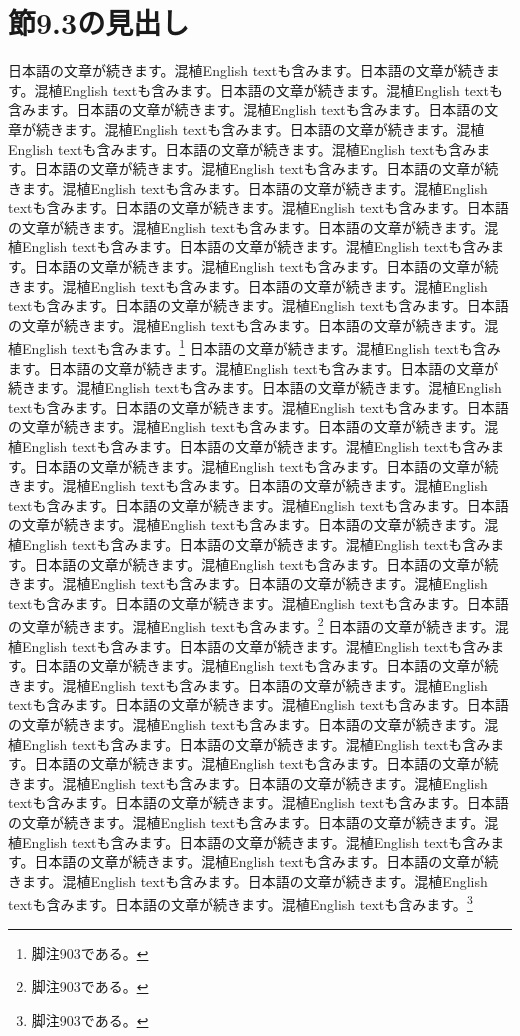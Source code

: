 \documentclass[pdflatex,book]{jlreq}
\begin{document}
\section{節9.3の見出し}
日本語の文章が続きます。混植English textも含みます。日本語の文章が続きます。混植English textも含みます。日本語の文章が続きます。混植English textも含みます。日本語の文章が続きます。混植English textも含みます。日本語の文章が続きます。混植English textも含みます。日本語の文章が続きます。混植English textも含みます。日本語の文章が続きます。混植English textも含みます。日本語の文章が続きます。混植English textも含みます。日本語の文章が続きます。混植English textも含みます。日本語の文章が続きます。混植English textも含みます。日本語の文章が続きます。混植English textも含みます。日本語の文章が続きます。混植English textも含みます。日本語の文章が続きます。混植English textも含みます。日本語の文章が続きます。混植English textも含みます。日本語の文章が続きます。混植English textも含みます。日本語の文章が続きます。混植English textも含みます。日本語の文章が続きます。混植English textも含みます。日本語の文章が続きます。混植English textも含みます。日本語の文章が続きます。混植English textも含みます。日本語の文章が続きます。混植English textも含みます。\footnote{脚注903である。}
日本語の文章が続きます。混植English textも含みます。日本語の文章が続きます。混植English textも含みます。日本語の文章が続きます。混植English textも含みます。日本語の文章が続きます。混植English textも含みます。日本語の文章が続きます。混植English textも含みます。日本語の文章が続きます。混植English textも含みます。日本語の文章が続きます。混植English textも含みます。日本語の文章が続きます。混植English textも含みます。日本語の文章が続きます。混植English textも含みます。日本語の文章が続きます。混植English textも含みます。日本語の文章が続きます。混植English textも含みます。日本語の文章が続きます。混植English textも含みます。日本語の文章が続きます。混植English textも含みます。日本語の文章が続きます。混植English textも含みます。日本語の文章が続きます。混植English textも含みます。日本語の文章が続きます。混植English textも含みます。日本語の文章が続きます。混植English textも含みます。日本語の文章が続きます。混植English textも含みます。日本語の文章が続きます。混植English textも含みます。日本語の文章が続きます。混植English textも含みます。\footnote{脚注903である。}
日本語の文章が続きます。混植English textも含みます。日本語の文章が続きます。混植English textも含みます。日本語の文章が続きます。混植English textも含みます。日本語の文章が続きます。混植English textも含みます。日本語の文章が続きます。混植English textも含みます。日本語の文章が続きます。混植English textも含みます。日本語の文章が続きます。混植English textも含みます。日本語の文章が続きます。混植English textも含みます。日本語の文章が続きます。混植English textも含みます。日本語の文章が続きます。混植English textも含みます。日本語の文章が続きます。混植English textも含みます。日本語の文章が続きます。混植English textも含みます。日本語の文章が続きます。混植English textも含みます。日本語の文章が続きます。混植English textも含みます。日本語の文章が続きます。混植English textも含みます。日本語の文章が続きます。混植English textも含みます。日本語の文章が続きます。混植English textも含みます。日本語の文章が続きます。混植English textも含みます。日本語の文章が続きます。混植English textも含みます。日本語の文章が続きます。混植English textも含みます。\footnote{脚注903である。}
\end{document}
